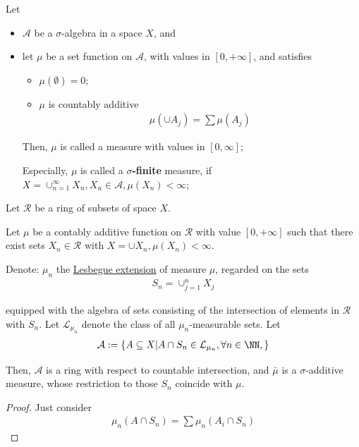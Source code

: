 \documentclass[Total.tex]{subfiles}
\begin{document}
				\begin{Def}
					Let 
					\begin{itemize}
						\item $\mathcal{A}$ be a $\sigma$-algebra in a space $X$, and 
						\item  let $\mu$ be a set function on $\mathcal{A}$, with values in $[0,+\infty]$, and satisfies
						\begin{itemize}
							\item $\mu(\emptyset)=0$;
							\item $\mu$ is countably additive
							\begin{gather*}
								\mu(\cup A_j)=\sum \mu(A_j)
							\end{gather*}
						\end{itemize}
						
						Then, $\mu$ is called a measure with values in $[0,\infty]$;
						
						Especially, $\mu$ is called a \textbf{$\sigma$-finite} measure, if $X=\cup_{n=1}^\infty X_n,X_n\in \mathcal{A},\mu(X_n )<\infty$;
					\end{itemize}
				\end{Def}
				
				\begin{lemma}
					Let $\mathcal{R}$ be a ring of subsets of space $X$. 
					
					Let $\mu$ be a contably additive function on $\mathcal{R}$ with value $[0,+\infty]$ such that there exist sets $X_n\in \mathcal{R}$ with $X=\cup X_n,\mu(X_n)<\infty$. 
					
					Denote: $\mu_n$ the \underline{Lesbegue extension} of measure $\mu$, regarded on the sets 
					\begin{gather*}
						S_n=\cup_{j=1}^n X_j
					\end{gather*} 
					
					equipped with the algebra of sets consisting of the intersection of elements in $\mathcal{R}$ with $S_n$. Let $\mathcal{L}_{\mu_n}$ denote the class of all $\mu_n$-measurable sets. Let
					\begin{gather*}
						\mathcal{A}:=\{A\subseteq X|A\cap S_n\in \mathcal{L}_{\mu_n},\forall n\in \NN,\}
					\end{gather*}
					
					Then, $\mathcal{A}$ is a ring with respect to countable intersection, and $\bar{\mu}$ is a $\sigma$-additive measure, whose restriction to those $S_n$ coincide with $\mu$. 
				\end{lemma}
				\begin{proof}
					Just consider 
					\begin{gather*}
						\mu_n(A\cap S_n )=\sum \mu_n(A_i\cap S_n)
					\end{gather*}
				\end{proof}
				
\end{document}
